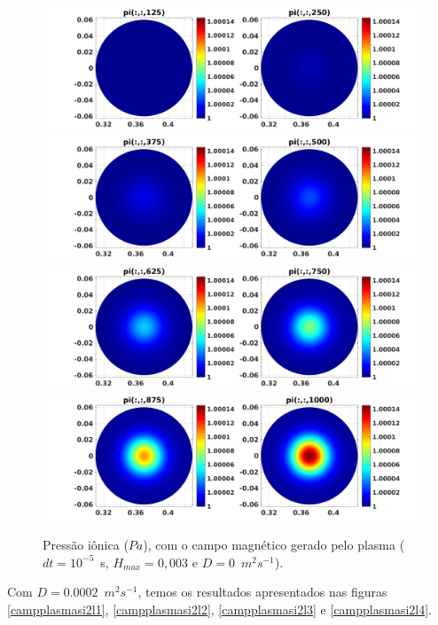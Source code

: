 \documentclass[12pt,oneside,a4paper]{abntex2}
\begin{document}
\begin{figure}[H]
\centering
\includegraphics[scale=0.5]{../SImulacao_breakdown/PDE/pitod1B3.png}  
\includegraphics[scale=0.5]{../SImulacao_breakdown/PDE/pitod2B3.png} 
\includegraphics[scale=0.5]{../SImulacao_breakdown/PDE/pitod3B3.png} 
\includegraphics[scale=0.5]{../SImulacao_breakdown/PDE/pitod4B3.png} 
\caption{Pressão iônica ($Pa$), com o campo magnético gerado pelo plasma ($dt=10^{-5}$\ s, $H_{max} = 0,003$ e $D=0$\ $m^2s^{-1}$).}
\label{campplasmasil4}
\end{figure}
\noindent Com $D=0.0002$\ $m^2s^{-1}$, temos os resultados apresentados nas figuras \ref{campplasmasi2l1}, \ref{campplasmasi2l2}, \ref{campplasmasi2l3} e \ref{campplasmasi2l4}.
\end{document}
